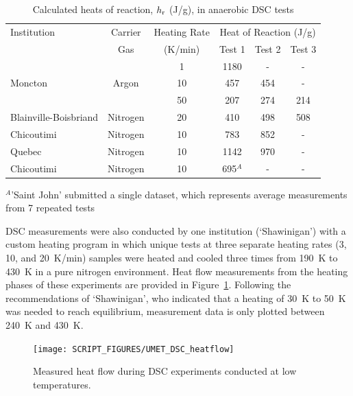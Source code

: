 \documentclass{book}
\begin{document}
\newpage
\begin{table}[h]
\caption{Calculated heats of reaction, $h_{\rm r}$ (J/g), in anaerobic DSC tests}
\label{Table_11}
\begin{center}
\begin{tabular}{|l|c|c|ccc|}
\hline
Institution           & Carrier     & Heating Rate         & \multicolumn{3}{|c|}{Heat of Reaction (J/g)} \\ \cline{4-6}
                      & Gas         & (K/min)              & Test 1  & Test 2  & Test 3                 \\ \hline
                      &             & 1                    & 1180    & -       & -                      \\
Moncton               & Argon       & 10                   & 457     & 454     & -                      \\
                      &             & 50                   & 207     & 274     & 214                    \\ \hline
Blainville-Boisbriand & Nitrogen    & 20                   & 410     & 498     & 508                    \\ \hline
Chicoutimi            & Nitrogen    & 10                   & 783     & 852     & -                      \\ \hline
Quebec                & Nitrogen    & 10                   & 1142    & 970     & -                      \\ \hline
Chicoutimi            & Nitrogen    & 10                   & 695$^A$ & -       & -                      \\ \hline
\end{tabular}
\end{center}
$^A$'Saint John' submitted a single dataset, which represents average measurements from 7 repeated tests
\end{table}

DSC measurements were also conducted by one institution (‘Shawinigan’) with a custom heating program in which unique tests at three separate heating rates (3, 10, and 20~K/min) samples were heated and cooled three times from 190~K to 430~K in a pure nitrogen environment. Heat flow measurements from the heating phases of these experiments are provided in Figure~\ref{Fig:UMET_DSC_heatflow}. Following the recommendations of ‘Shawinigan’, who indicated that a heating of 30~K to 50~K was needed to reach equilibrium, measurement data is only plotted between 240~K and 430~K.

\begin{figure}[h]
  \centering
  \texttt{[image: SCRIPT\_FIGURES/UMET\_DSC\_heatflow]}
  \caption{Measured heat flow during DSC experiments conducted at low temperatures.}
  \label{Fig:UMET_DSC_heatflow}
\end{figure}
\end{document}
